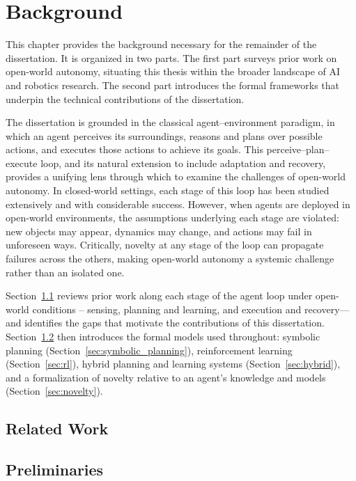 \chapter{Background}
\label{ch:background}

This chapter provides the background necessary for the remainder of the dissertation. It is organized in two parts. The first part surveys prior work on open-world autonomy, situating this thesis within the broader landscape of AI and robotics research. The second part introduces the formal frameworks that underpin the technical contributions of the dissertation.

The dissertation is grounded in the classical agent--environment paradigm, in which an agent perceives its surroundings, reasons and plans over possible actions, and executes those actions to achieve its goals. This perceive--plan--execute loop, and its natural extension to include adaptation and recovery, provides a unifying lens through which to examine the challenges of open-world autonomy. In closed-world settings, each stage of this loop has been studied extensively and with considerable success. However, when agents are deployed in open-world environments, the assumptions underlying each stage are violated: new objects may appear, dynamics may change, and actions may fail in unforeseen ways. Critically, novelty at any stage of the loop can propagate failures across the others, making open-world autonomy a systemic challenge rather than an isolated one.

Section~\ref{sec:related_work} reviews prior work along each stage of the agent loop under open-world conditions -- sensing, planning and learning, and execution and recovery---and identifies the gaps that motivate the contributions of this dissertation. Section~\ref{sec:preliminaries} then introduces the formal models used throughout: symbolic planning (Section~\ref{sec:symbolic_planning}), reinforcement learning (Section~\ref{sec:rl}), hybrid planning and learning systems (Section~\ref{sec:hybrid}), and a formalization of novelty relative to an agent's knowledge and models (Section~\ref{sec:novelty}).

\section{Related Work}
\label{sec:related_work}



\section{Preliminaries}
\label{sec:preliminaries}


